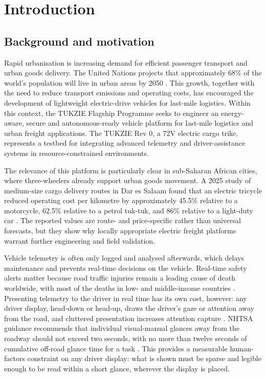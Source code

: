 \chapter{Introduction}
\label{chap:intro}

\section{Background and motivation}

Rapid urbanisation is increasing demand for efficient passenger transport and urban goods delivery. The United Nations projects that approximately 68\% of the world's population will live in urban areas by 2050 \cite{unwup2019}. This growth, together with the need to reduce transport emissions and operating costs, has encouraged the development of lightweight electric-drive vehicles for last-mile logistics. Within this context, the TUKZIE Flagship Programme seeks to engineer an energy-aware, secure and autonomous-ready vehicle platform for last-mile logistics and urban freight applications. The TUKZIE Rev 0, a 72V electric cargo trike, represents a testbed for integrating advanced telemetry and driver-assistance systems in resource-constrained environments.

The relevance of this platform is particularly clear in sub-Saharan African cities, where three-wheelers already support urban goods movement. A 2025 study of medium-size cargo delivery routes in Dar es Salaam found that an electric tricycle reduced operating cost per kilometre by approximately 45.5\% relative to a motorcycle, 62.5\% relative to a petrol tuk-tuk, and 86\% relative to a light-duty car \cite{sebwa2025}. The reported values are route- and price-specific rather than universal forecasts, but they show why locally appropriate electric freight platforms warrant further engineering and field validation.

Vehicle telemetry is often only logged and analysed afterwards, which delays maintenance and prevents real-time decisions on the vehicle. Real-time safety alerts matter because road traffic injuries remain a leading cause of death worldwide, with most of the deaths in low- and middle-income countries \cite{who2023}. Presenting telemetry to the driver in real time has its own cost, however: any driver display, head-down or head-up, draws the driver's gaze or attention away from the road, and cluttered presentation increases attention capture \cite{liu2003, hauslschmid2015}. NHTSA guidance recommends that individual visual-manual glances away from the roadway should not exceed two seconds, with no more than twelve seconds of cumulative off-road glance time for a task \cite{nhtsa2013}. This provides a measurable human-factors constraint on any driver display: what is shown must be sparse and legible enough to be read within a short glance, wherever the display is placed.

